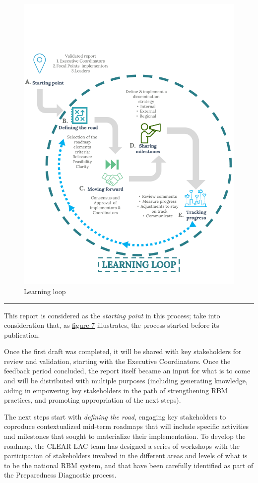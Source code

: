 \documentclass[
  10pt,
]{book}
\begin{document}
\begin{figure}

{\centering \includegraphics[width=0.75\linewidth]{./images/figure_7} 

}

\caption{Learning loop}\label{fig:figure7}
\end{figure}

\begin{center}\rule{0.5\linewidth}{0.5pt}\end{center}

This report is considered as the \emph{starting point} in this process; take into consideration that, as \protect\hyperlink{fig:figure7}{figure 7} illustrates, the process started before its publication.

Once the first draft was completed, it will be shared with key stakeholders for review and validation, starting with the Executive Coordinators. Once the feedback period concluded, the report itself became an input for what is to come and will be distributed with multiple purposes (including generating knowledge, aiding in empowering key stakeholders in the path of strengthening RBM practices, and promoting appropriation of the next steps).

The next steps start with \emph{defining the road}, engaging key stakeholders to coproduce contextualized mid-term roadmaps that will include specific activities and milestones that sought to materialize their implementation. To develop the roadmap, the CLEAR LAC team has designed a series of workshops with the participation of stakeholders involved in the different areas and levels of what is to be the national RBM system, and that have been carefully identified as part of the Preparedness Diagnostic process.
\end{document}
